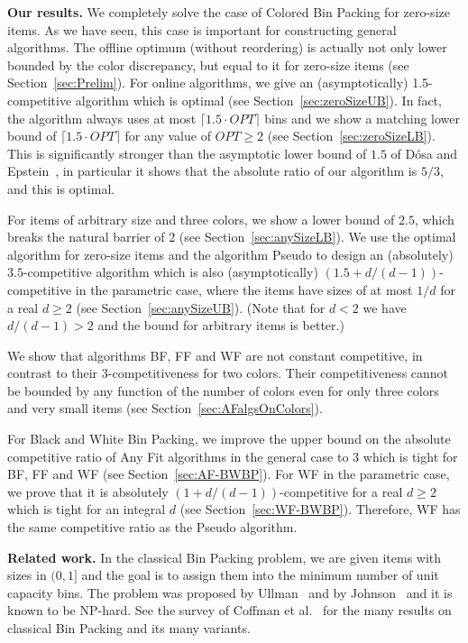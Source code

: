 \documentclass[11pt,a4paper]{article}
\def\vari#1{\mathit{#1}}
\begin{document}
\medskip

\textbf{Our results.}
We completely solve the case of Colored Bin Packing for zero-size
items. As we have seen, this case is important for constructing
general algorithms.
The offline optimum (without reordering) is actually not only
lower bounded by the color discrepancy, but equal to it for zero-size
items (see Section~\ref{sec:Prelim}). For online
algorithms, we give an (asymptotically) 1.5-competitive algorithm
which is optimal (see Section~\ref{sec:zeroSizeUB}).
In fact, the algorithm always uses at most
$\lceil1.5\cdot\vari{OPT}\rceil$ bins and we show a matching lower
bound of $\lceil1.5\cdot\vari{OPT}\rceil$ for any value of
$\vari{OPT}\geq 2$ (see Section~\ref{sec:zeroSizeLB}).
This is significantly stronger than the asymptotic
lower bound of $1.5$ of D\'osa and Epstein~\cite{DosEps14}, in
particular it shows that the absolute ratio of our algorithm is $5/3$,
and this is optimal.

For items of arbitrary size and three colors, we show a lower bound of
$2.5$, which breaks the natural barrier of 2 (see Section~\ref{sec:anySizeLB}).
We use the optimal algorithm for zero-size items and the algorithm Pseudo to design an
(absolutely) $3.5$-competitive algorithm which is also
(asymptotically) $(1.5+d/(d-1))$-competitive in the parametric case,
where the items have sizes of at most $1/d$ for a real $d \geq 2$
(see Section~\ref{sec:anySizeUB}). (Note
that for $d<2$ we have $d/(d-1)>2$ and the bound for arbitrary items
is better.)

We show that algorithms BF, FF and WF are not
constant competitive, in contrast to their $3$-competitiveness for two colors.
Their competitiveness cannot be
bounded by any function of the number of colors even for only three
colors and very small items (see Section~\ref{sec:AFalgsOnColors}).

For Black and White Bin Packing,
we improve the upper bound on the
absolute competitive ratio of Any Fit algorithms in the general case
to $3$ which is tight for BF, FF and WF (see Section~\ref{sec:AF-BWBP}).  For WF in the parametric
case, we prove that it is absolutely $(1+d/(d-1))$-competitive for a real $d\geq 2$
which is tight for an integral $d$ (see Section~\ref{sec:WF-BWBP}).
Therefore, WF has the same competitive ratio as the Pseudo algorithm.

\medskip

\textbf{Related work.}
In the classical Bin Packing problem, we are given items with sizes in
$(0,1]$ and the goal is to assign them into the minimum number of
unit capacity bins. The problem was proposed by
Ullman~\cite{ullman71} and by Johnson~\cite{johnson73} and it is
known to be NP-hard. See the survey of Coffman et al.~\cite{coffman13} for the many
results on classical Bin Packing and its many variants.
\end{document}
